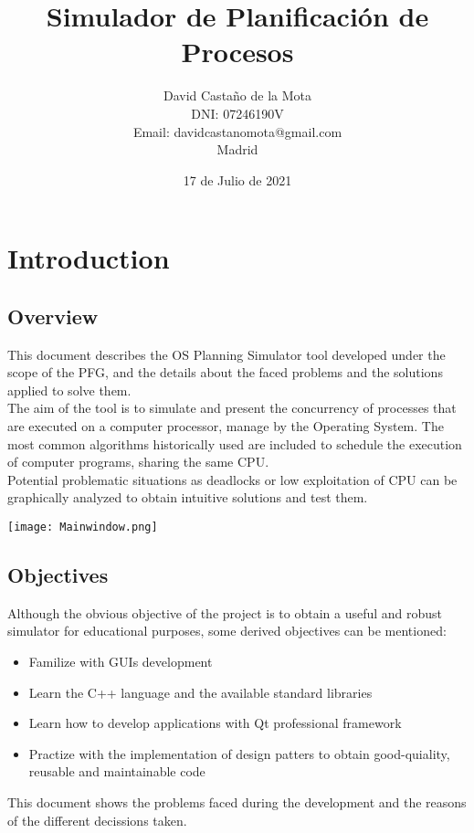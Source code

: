 \documentclass{report}
\title{\Huge Simulador de Planificación de Procesos}
\author{David Castaño de la Mota \\ DNI: 07246190V \\ Email: davidcastanomota@gmail.com\\Madrid}
\date{17 de Julio de 2021}
\begin{document}
\maketitle

\tableofcontents{}


\chapter{Introduction}
    \section{Overview}
        This document describes the OS Planning Simulator tool developed under the scope of the PFG, and the details about the faced problems and the solutions applied to solve them.\\
        The aim of the tool is to simulate and present the concurrency of processes that are executed on a computer processor, manage by the Operating System. The most common algorithms historically used are included to schedule the execution of computer programs, sharing the same CPU.\\
        Potential problematic situations as deadlocks or low exploitation of CPU can be graphically analyzed to obtain intuitive solutions and test them.
        \begin{center}
            \texttt{[image: Mainwindow.png]}
        \end{center} 
 \section{Objectives}
        Although the obvious objective of the project is to obtain a useful and robust simulator for educational purposes, some derived objectives can be mentioned:
        \begin{itemize}
            \item Familize with GUIs development
            \item Learn the C++ language and the available standard libraries
            \item Learn how to develop applications with Qt professional framework
            \item Practize with the implementation of design patters to obtain good-quiality, reusable and maintainable code
        \end{itemize}
        This document shows the problems faced during the development and the reasons of the different decissions taken.\\
\end{document}
